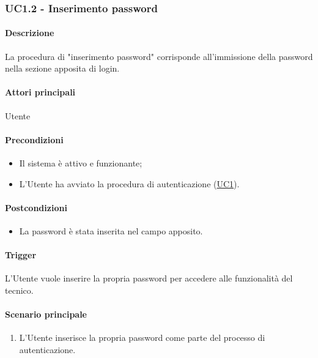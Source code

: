 
\subsubsection{UC1.2 - Inserimento password}\label{UC1point2}
\paragraph*{Descrizione}
La procedura di "inserimento password" corrisponde all'immissione della password nella sezione apposita di login.

\paragraph*{Attori principali}
Utente

\paragraph*{Precondizioni}
\begin{itemize}
  \item Il sistema è attivo e funzionante;
  \item L'Utente ha avviato la procedura di autenticazione (\hyperref[UC1]{UC1}). 
\end{itemize}

\paragraph*{Postcondizioni}
\begin{itemize}
  \item La password è stata inserita nel campo apposito.
\end{itemize}

\paragraph*{Trigger}
L'Utente vuole inserire la propria password per accedere alle funzionalità del tecnico.

\paragraph*{Scenario principale}
\begin{enumerate}
  \item L'Utente inserisce la propria password come parte del processo di autenticazione.
\end{enumerate}
